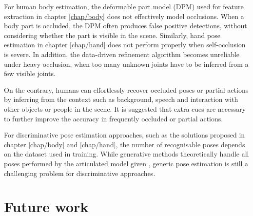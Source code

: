 For human body estimation, the deformable part model (DPM) used for feature extraction in chapter \ref{chap/body} does not effectively model occlusions. When a body part is occluded, the DPM often produces false positive detections, without considering whether the part is visible in the scene. Similarly, hand pose estimation in chapter \ref{chap/hand} does not perform properly when self-occlusion is severe. In addition, the data-driven refinement algorithm becomes unreliable under heavy occlusion, when too many unknown joints have to be inferred from a few visible joints. 

On the contrary, humans can effortlessly recover occluded poses or partial actions by inferring from the context such as background, speech and interaction with other objects or people in the scene. It is suggested that extra cues are necessary to further improve the accuracy in frequently occluded or partial actions. 

For discriminative pose estimation approaches, such as the solutions proposed in chapter \ref{chap/body} and \ref{chap/hand}, the number of recognisable poses depends on the dataset used in training. While generative methods theoretically handle all poses performed by the articulated model given \cite{Oikonomidis2011}, generic pose estimation is still a challenging problem for discriminative approaches. 

\section{Future work}

